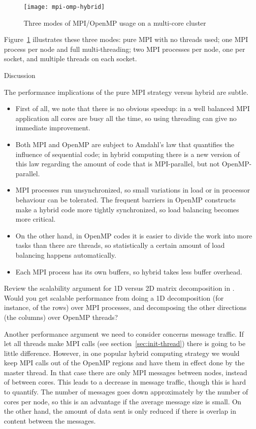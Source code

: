 \begin{figure}[ht]
  \texttt{[image: mpi-omp-hybrid]}
  \caption{Three modes of MPI/OpenMP usage on a multi-core cluster}
  \label{fig:hybrid-modes}
\end{figure}
%
Figure~\ref{fig:hybrid-modes} illustrates these three modes: pure MPI
with no threads used; one MPI process per node and full
multi-threading; two MPI processes per node, one per socket, and
multiple threads on each socket.

 {Discussion}

The performance implications of the pure MPI strategy versus hybrid
are subtle.
\begin{itemize}
\item First of all, we note that there is no obvious speedup: in a
  well balanced MPI application all cores are busy all the time, so
  using threading can give no immediate improvement.
\item Both MPI and OpenMP are subject to Amdahl's law that quantifies
  the influence of sequential code; in hybrid computing there is a new
  version of this law regarding the amount of code that is
  MPI-parallel, but not OpenMP-parallel.
\item MPI processes run unsynchronized, so small variations in load or
  in processor behaviour can be tolerated. The frequent barriers in
  OpenMP constructs make a hybrid code more tightly synchronized, so
  load balancing becomes more critical.
\item On the other hand, in OpenMP codes it is easier to divide the
  work into more tasks than there are threads, so statistically a
  certain amount of load balancing happens automatically.
\item Each MPI process has its own buffers, so hybrid takes less
  buffer overhead.
\end{itemize}

\begin{exercise}
  Review the scalability argument for 1D versus 2D matrix
  decomposition in . Would you get
  scalable performance from doing a 1D decomposition (for instance, of
  the rows) over MPI processes, and decomposing the other directions
  (the columns) over OpenMP threads?
\end{exercise}

Another performance argument we need to consider concerns message
traffic.  If let all threads make MPI calls (see
section~\ref{sec:init-thread}) there is going to be little
difference. However, in one popular hybrid computing strategy we would
keep MPI calls out of the OpenMP regions and have them in effect done
by the master thread.
%
In that case there are only MPI messages
between nodes, instead of between cores. This leads to a decrease in
message traffic, though this is hard to quantify. The number of
messages goes down approximately by the number of cores per node, so
this is an advantage if the average message size is small. On the
other hand, the amount of data sent is only reduced if there is
overlap in content between the messages.

